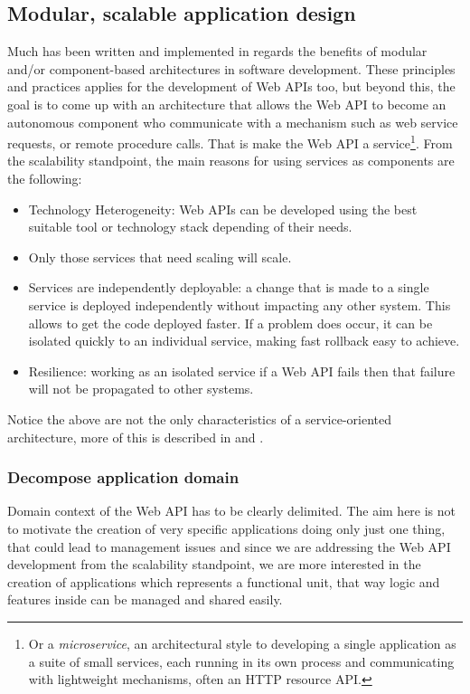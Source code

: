 \documentclass[10pt,article]{IEEEtran}
\begin{document}
\subsection{Modular, scalable application design}
Much has been written and implemented in regards the benefits of modular and/or component-based architectures in software development. These principles and practices applies for the development of Web APIs too, but beyond this, the goal is to come up with an architecture that allows the Web API to become an autonomous component who communicate with a mechanism such as web service requests, or remote procedure calls. That is make the Web API a service\footnote{Or a \textit{microservice}, an architectural style to developing a single application as a suite of small services, each running in its own process and communicating with lightweight mechanisms, often an HTTP resource API\cite{monolit:fowler}. }.
From the scalability standpoint, the main reasons for using services as components are the following:
\begin{itemize}
    \item
    Technology Heterogeneity: Web APIs can be developed using the best suitable tool or technology stack depending of their needs.
    \item
    Only those services that need scaling will scale.
    \item
    Services are independently deployable: a change that is made to a single service is deployed  independently without impacting any other system. This allows to get the code deployed faster. If a problem does occur, it can be isolated quickly to an individual service, making fast rollback easy to achieve.
    \item
    Resilience: working as an isolated service if a Web API fails then that failure will not be propagated to other systems.
\end{itemize}

Notice the above are not the only characteristics of a service-oriented architecture, more of this is described in \cite{microservices} and \cite{monolit:fowler}. 

\subsubsection{Decompose application domain}
Domain context of the Web API has to be clearly delimited. The aim here is not to motivate the creation of very specific applications doing only just one thing, that could lead to management issues and since we are addressing the Web API development from the scalability standpoint, we are more interested in the creation of applications which represents a functional unit, that way logic and features inside can be managed and shared easily.
\end{document}
